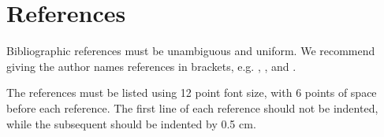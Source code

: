\documentclass[12pt]{article}
\begin{document}
\section{References}

Bibliographic references must be unambiguous and uniform.  We recommend giving
the author names references in brackets, e.g. \cite{knuth:84},
\cite{boulic:91}, and \cite{smith:99}.

The references must be listed using 12 point font size, with 6 points of space
before each reference. The first line of each reference should not be
indented, while the subsequent should be indented by 0.5 cm.



\end{document}
